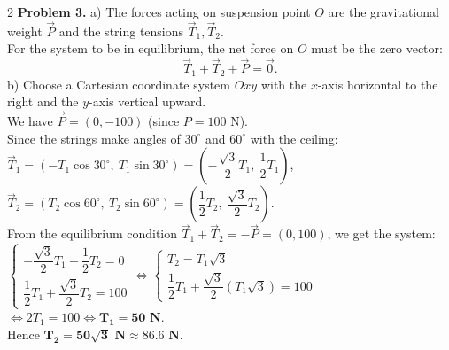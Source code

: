 \documentclass[10pt,a4paper]{article}
\begin{document}
\begin{multicols}{2}
\textbf{Problem 3.}
a) The forces acting on suspension point $O$ are the gravitational weight $\vec{P}$ and the string tensions $\vec{T}_1, \vec{T}_2$.\\
For the system to be in equilibrium, the net force on $O$ must be the zero vector:
$$\vec{T}_1 + \vec{T}_2 + \vec{P} = \vec{0}.$$
b) Choose a Cartesian coordinate system $Oxy$ with the $x$-axis horizontal to the right and the $y$-axis vertical upward.\\
We have $\vec{P} = (0, -100)$ (since $P = 100\text{ N}$).\\
Since the strings make angles of $30^\circ$ and $60^\circ$ with the ceiling:\\
$\vec{T}_1 = (-T_1 \cos 30^\circ,\ T_1 \sin 30^\circ) = \left(-\dfrac{\sqrt{3}}{2}T_1,\ \dfrac{1}{2}T_1\right)$,\\
$\vec{T}_2 = (T_2 \cos 60^\circ,\ T_2 \sin 60^\circ) = \left(\dfrac{1}{2}T_2,\ \dfrac{\sqrt{3}}{2}T_2\right)$.\\
From the equilibrium condition $\vec{T}_1 + \vec{T}_2 = -\vec{P} = (0, 100)$, we get the system:\\
$\begin{cases} -\dfrac{\sqrt{3}}{2}T_1 + \dfrac{1}{2}T_2 = 0 \\[4pt] \dfrac{1}{2}T_1 + \dfrac{\sqrt{3}}{2}T_2 = 100 \end{cases} \Leftrightarrow \begin{cases} T_2 = T_1\sqrt{3} \\[4pt] \dfrac{1}{2}T_1 + \dfrac{\sqrt{3}}{2}(T_1\sqrt{3}) = 100 \end{cases}$\\
$\Leftrightarrow 2T_1 = 100 \Leftrightarrow \mathbf{T_1 = 50\text{ N}}$.\\
Hence $\mathbf{T_2 = 50\sqrt{3}\text{ N}} \approx \mathbf{86.6\text{ N}}$.

\end{multicols}
\end{document}
